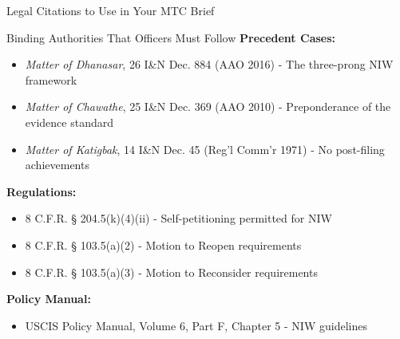 \documentclass[11pt]{beamer}
\begin{document}
	\begin{frame}{Legal Citations to Use in Your MTC Brief}
		\scriptsize
		\begin{block}{Binding Authorities That Officers Must Follow}
			\textbf{Precedent Cases:}
			\begin{itemize}
				\item \textit{Matter of Dhanasar}, 26 I\&N Dec. 884 (AAO 2016) - The three-prong NIW framework
				\item \textit{Matter of Chawathe}, 25 I\&N Dec. 369 (AAO 2010) - Preponderance of the evidence standard
				\item \textit{Matter of Katigbak}, 14 I\&N Dec. 45 (Reg’l Comm’r 1971) - No post-filing achievements
			\end{itemize}
			\textbf{Regulations:}
			\begin{itemize}
				\item 8 C.F.R. § 204.5(k)(4)(ii) - Self-petitioning permitted for NIW
				\item 8 C.F.R. § 103.5(a)(2) - Motion to Reopen requirements
				\item 8 C.F.R. § 103.5(a)(3) - Motion to Reconsider requirements
			\end{itemize}
			\textbf{Policy Manual:}
			\begin{itemize}
				\item USCIS Policy Manual, Volume 6, Part F, Chapter 5 - NIW guidelines
			\end{itemize}
		\end{block}
	\end{frame}
	
	
\end{document}
